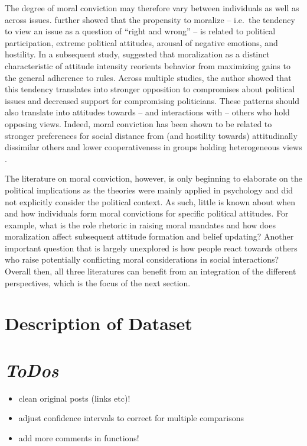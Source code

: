 \documentclass[11pt,]{article}
\providecommand{\tightlist}{%
\setlength{\itemsep}{0pt}\setlength{\parskip}{0pt}}
\begin{document}
The degree of moral conviction may therefore vary between individuals as
well as across issues. \citet{ryan2014reconsidering} further showed that
the propensity to moralize -- i.e.~the tendency to view an issue as a
question of ``right and wrong'' -- is related to political
participation, extreme political attitudes, arousal of negative
emotions, and hostility. In a subsequent study, \citet{ryan2016no}
suggested that moralization as a distinct characteristic of attitude
intensity reorients behavior from maximizing gains to the general
adherence to rules. Across multiple studies, the author showed that this
tendency translates into stronger opposition to compromises about
political issues and decreased support for compromising politicians.
These patterns should also translate into attitudes towards -- and
interactions with -- others who hold opposing views. Indeed, moral
conviction has been shown to be related to stronger preferences for
social distance from (and hostility towards) attitudinally dissimilar
others and lower cooperativeness in groups holding heterogeneous views
\citep{skitka2005moral}.

The literature on moral conviction, however, is only beginning to
elaborate on the political implications as the theories were mainly
applied in psychology and did not explicitly consider the political
context. As such, little is known about when and how individuals form
moral convictions for specific political attitudes. For example, what is
the role rhetoric in raising moral mandates and how does moralization
affect subsequent attitude formation and belief updating? Another
important question that is largely unexplored is how people react
towards others who raise potentially conflicting moral considerations in
social interactions? Overall then, all three literatures can benefit
from an integration of the different perspectives, which is the focus of
the next section.

\section{Description of Dataset}\label{description-of-dataset}

\section{\texorpdfstring{\emph{ToDos}}{ToDos}}\label{todos}

\begin{itemize}
\tightlist
\item
  clean original posts (links etc)!
\item
  adjust confidence intervals to correct for multiple comparisons
\item
  add more comments in functions!
\end{itemize}
\end{document}
